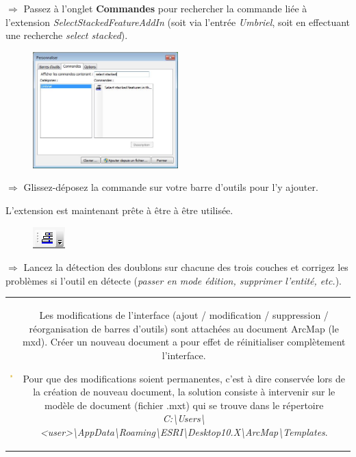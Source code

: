 \documentclass[11pt]{article}
\newcommand{\action}{$\Rightarrow$ }
\newenvironment{note}{%
	\begin{tabular}[t t]{c c}
		\includegraphics{img/tips.png}
		 &
		\begin{minipage}[c]{0.9\linewidth}
			\begin{sffamily}
}{%
			\end{sffamily}
		\end{minipage}
	\end{tabular}	
}
\begin{document}
\action Passez à l'onglet \textbf{Commandes} pour rechercher la commande liée à l'extension \textit{SelectStackedFeatureAddIn} (soit via l'entrée \textit{Umbriel}, soit en effectuant une recherche \textit{select stacked}).
\begin{figure}[H]
	\center \includegraphics[width=0.5\textwidth]{img/td1/am_fenetre_personnaliser-2.png} \\
\end{figure}

\action Glissez-déposez la commande sur votre barre d'outils pour l'y ajouter.

L'extension est maintenant prête à être à être utilisée.
\begin{figure}[H]
	\center \includegraphics{img/td1/am_detection_doublons.png} \\
\end{figure}

\action Lancez la détection des doublons sur chacune des trois couches et corrigez les problèmes si l'outil en détecte (\textit{passer en mode édition, supprimer l'entité, etc.}).

\begin{note}
Les modifications de l'interface (ajout / modification / suppression / réorganisation de barres d'outils) sont attachées au document ArcMap (le mxd). Créer un nouveau document a pour effet de réinitialiser complètement l'interface. 

Pour que des modifications soient permanentes, c'est à dire conservée lors de la création de nouveau document, la solution consiste à intervenir sur le modèle de document (fichier .mxt) qui se trouve dans le répertoire \textit{C:\textbackslash{}Users\textbackslash{}<user>\textbackslash{}AppData\textbackslash{}Roaming\textbackslash{}ESRI\textbackslash{}Desktop10.X\textbackslash{}ArcMap\textbackslash{}Templates}.
\end{note}
\end{document}
